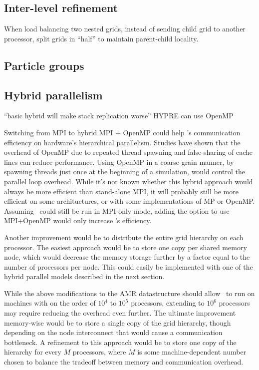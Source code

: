 \documentclass{article}
\begin{document}
\subsection{Inter-level refinement} \label{solution:amr-balance-split}
When load balancing two nested grids, instead of
sending child grid to another processor, split grids
in ``half'' to maintain parent-child locality.
\subsection{Particle groups} \label{solution:particles-group}
\subsection{Hybrid parallelism}\label{solution:parallel-hybrid}
   ``basic hybrid will make stack replication worse''
   HYPRE can use OpenMP

  Switching from MPI to hybrid MPI + OpenMP could help \enzo's
  communication efficiency on hardware's hierarchical parallelism.
  Studies have shown that the overhead of OpenMP due to repeated
  thread spawning and false-sharing of cache lines can reduce
  performance.  Using OpenMP in a coarse-grain manner, by spawning
  threads just once at the beginning of a simulation, would control
  the parallel loop overhead.  While it's not known whether this
  hybrid approach would always be more efficient than stand-alone MPI,
  it will probably still be more efficient on some archituctures, or
  with some implementations of MP or OpenMP.  Assuming \enzo\ could
  still be run in MPI-only mode, adding the option to use MPI+OpenMP
  would only increase \enzo's efficiency.

  Another improvement would be to distribute the entire grid hierarchy
  on each processor.  The easiest approach would be to store one copy
  per shared memory node, which would decrease the memory storage
  further by a factor equal to the number of processors per node. This
  could easily be implemented with one of the hybrid parallel models
  described in the next section.

   While the above modifications to the AMR datastructure should allow
   \enzo\ to run on machines with on the order of $10^4$ to $10^5$
   processors, extending to $10^6$ processors may require reducing the
   overhead even further.  The ultimate improvement memory-wise would
   be to store a single copy of the grid hierarchy, though depending
   on the node interconnect that would cause a communication
   bottleneck.  A refinement to this approach would be to store one
   copy of the hierarchy for every $M$ processors, where $M$ is some
   machine-dependent number chosen to balance the tradeoff between
   memory and communication overhead.
\end{document}
